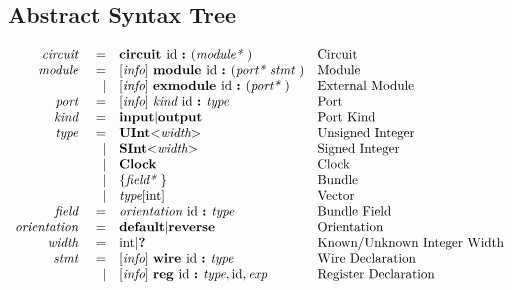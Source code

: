 \documentclass[12pt]{article}
\begin{document}
\subsection{Abstract Syntax Tree}
{ \fontsize{11pt}{1.15em}\selectfont
\[
\begin{array}{rrll}
\text{\em circuit\ }    &=     &\text{\bf circuit\ } \text{id } \text{\bf :\ } (\text{\em module*\ })                                        &\text{Circuit}\\
\text{\em module\ }     &=     &[\text{\em info}]\  \text{\bf module\ }  \text{id } \text{\bf :\ } (\text{\em port*\ } \text{\em stmt\ })                          &\text{Module}\\
                &\vert &[\text{\em info}]\  \text{\bf exmodule\ }  \text{id } \text{\bf :\ } (\text{\em port*\ })                                  &\text{External Module}\\
\text{\em port\ }       &=     &[\text{\em info}]\  \text{\em kind\ } \text{id } \text{\bf :\ } \text{\em type\ }                                          &\text{Port}\\
\text{\em kind\ }       &=     &\text{\bf input} \vert \text{\bf output}                                                &\text{Port Kind}\\
\text{\em type\ }       &=     &\text{\bf UInt} \text{\bf $<$} \text{\em width} \text{\bf $>$}                                    &\text{Unsigned Integer}\\
                &\vert &\text{\bf SInt} \text{\bf $<$} \text{\em width} \text{\bf $>$}                                    &\text{Signed Integer}\\
                &\vert &\text{\bf Clock}                                                                   &\text{Clock}\\
                &\vert &\{\text{\em field*\ }\}                                                         &\text{Bundle}\\
                &\vert &\text{\em type}[\text{int}]                                                             &\text{Vector}\\
\text{\em field\ }      &=     &\text{\em orientation\ } \text{id } \text{\bf :\ } \text{\em type\ }                                         &\text{Bundle Field}\\
\text{\em orientation\ }&=     &\text{\bf default} \vert \text{\bf reverse}                                             &\text{Orientation}\\
\text{\em width\ }      &=     &\text{int} \vert \text{\bf ?\ }                                                            &\text{Known/Unknown Integer Width}\\
\text{\em stmt\ }       &=     &[\text{\em info}]\  \text{\bf wire\ } \text{id } \text{\bf :\ } \text{\em type\ }                                          &\text{Wire Declaration}\\
                &\vert &[\text{\em info}]\  \text{\bf reg\ } \text{id } \text{\bf :\ }  \text{\em type} , \text{id} , \text{\em exp}                      &\text{Register Declaration}\\

\end{array}\]}
\end{document}
